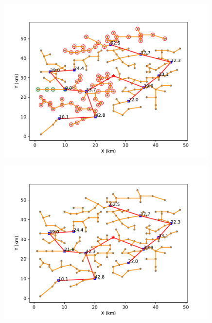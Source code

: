 \documentclass{cumcmthesis}
\begin{document}
  \begin{figure}[!h]
    \centering
    \begin{minipage}[c]{0.45\textwidth}
        \centering
        \includegraphics[width=0.99\textwidth]{figure/pipline_graft_connection_2.pdf}
        \label{fig:pipline_graft_connection_2}
    \end{minipage}
    \begin{minipage}[c]{0.45\textwidth}
        \centering
        \includegraphics[width=0.99\textwidth]{figure/pipline_graft_cut_2.pdf}
        \label{fig:pipline_graft_cut_2}
    \end{minipage}
  \end{figure}
  
\end{document}
